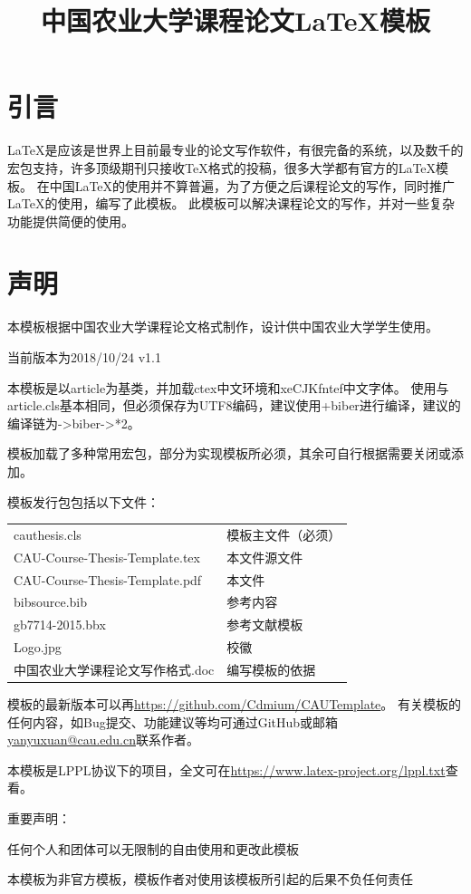 \documentclass[twoside,maketable]{cauthesis}
\title{中国农业大学课程论文\LaTeX{}模板}%
\date{}%
\author{}%
\begin{document}
    \section{引言}
    \LaTeX{}是应该是世界上目前最专业的论文写作软件，有很完备的系统，以及数千的宏包支持，许多顶级期刊只接收\TeX{}格式的投稿，很多大学都有官方的\LaTeX{}模板。
    在中国\LaTeX{}的使用并不算普遍，为了方便之后课程论文的写作，同时推广\LaTeX{}的使用，编写了此模板。
    此模板可以解决课程论文的写作，并对一些复杂功能提供简便的使用。
    \section{声明}
    本模板根据中国农业大学课程论文格式制作，设计供中国农业大学学生使用。

    当前版本为2018/10/24 v1.1

    本模板是以article为基类，并加载ctex中文环境和xeCJKfntef中文字体。
    使用与article.cls基本相同，但必须保存为UTF8编码，建议使用\XeLaTeX{}+biber进行编译，建议的编译链为\XeLaTeX{}->biber->\XeLaTeX{}*2。

    模板加载了多种常用宏包，部分为实现模板所必须，其余可自行根据需要关闭或添加。

    模板发行包包括以下文件：

    \begin{table}[H]
        \begin{tabular}{ll}
            cauthesis.cls&模板主文件（必须）\\
            CAU-Course-Thesis-Template.tex&本文件源文件\\
            CAU-Course-Thesis-Template.pdf&本文件\\
            bibsource.bib&参考内容\\
            gb7714-2015.bbx&参考文献模板\\
            Logo.jpg&校徽\\
            中国农业大学课程论文写作格式.doc&编写模板的依据
        \end{tabular}
    \end{table}
    
    模板的最新版本可以再\url{https://github.com/Cdmium/CAUTemplate}。
    有关模板的任何内容，如Bug提交、功能建议等均可通过GitHub或邮箱\url{yanyuxuan@cau.edu.cn}联系作者。

    本模板是LPPL协议下的项目，全文可在\url{https://www.latex-project.org/lppl.txt}查看。

    重要声明：
    \begin{level}{1}
        \item 任何个人和团体可以无限制的自由使用和更改此模板
        \item 本模板为非官方模板，模板作者对使用该模板所引起的后果不负任何责任
    \end{level}
\end{document}

